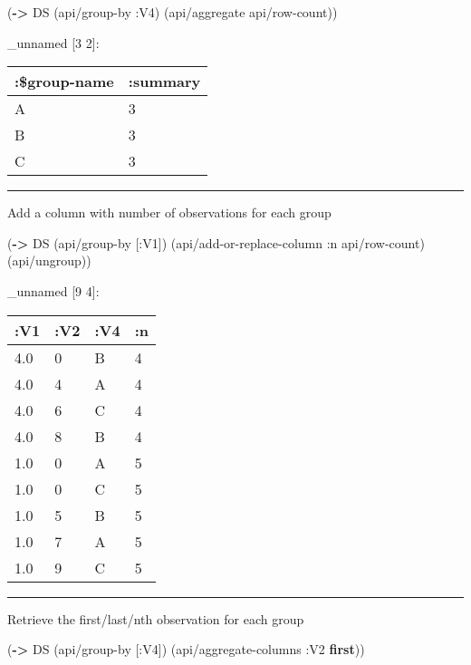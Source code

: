\documentclass[]{article}
\newenvironment{Shaded}{\begin{snugshade}}{\end{snugshade}}
\newcommand{\AttributeTok}[1]{\textcolor[rgb]{0.77,0.63,0.00}{#1}}
\newcommand{\KeywordTok}[1]{\textcolor[rgb]{0.13,0.29,0.53}{\textbf{#1}}}
\newcommand{\NormalTok}[1]{#1}
\begin{document}
\begin{Shaded}
\begin{Highlighting}[]
\NormalTok{(}\KeywordTok{->}\NormalTok{ DS}
\NormalTok{    (api/group-by }\AttributeTok{:V4}\NormalTok{)}
\NormalTok{    (api/aggregate api/row-count))}
\end{Highlighting}
\end{Shaded}

\_unnamed {[}3 2{]}:

\begin{longtable}[]{@{}ll@{}}
\toprule
:\$group-name & :summary\tabularnewline
\midrule
\endhead
A & 3\tabularnewline
B & 3\tabularnewline
C & 3\tabularnewline
\bottomrule
\end{longtable}

\begin{center}\rule{0.5\linewidth}{0.5pt}\end{center}

Add a column with number of observations for each group

\begin{Shaded}
\begin{Highlighting}[]
\NormalTok{(}\KeywordTok{->}\NormalTok{ DS}
\NormalTok{    (api/group-by [}\AttributeTok{:V1}\NormalTok{])}
\NormalTok{    (api/add-or-replace-column }\AttributeTok{:n}\NormalTok{ api/row-count)}
\NormalTok{    (api/ungroup))}
\end{Highlighting}
\end{Shaded}

\_unnamed {[}9 4{]}:

\begin{longtable}[]{@{}llll@{}}
\toprule
:V1 & :V2 & :V4 & :n\tabularnewline
\midrule
\endhead
4.0 & 0 & B & 4\tabularnewline
4.0 & 4 & A & 4\tabularnewline
4.0 & 6 & C & 4\tabularnewline
4.0 & 8 & B & 4\tabularnewline
1.0 & 0 & A & 5\tabularnewline
1.0 & 0 & C & 5\tabularnewline
1.0 & 5 & B & 5\tabularnewline
1.0 & 7 & A & 5\tabularnewline
1.0 & 9 & C & 5\tabularnewline
\bottomrule
\end{longtable}

\begin{center}\rule{0.5\linewidth}{0.5pt}\end{center}

Retrieve the first/last/nth observation for each group

\begin{Shaded}
\begin{Highlighting}[]
\NormalTok{(}\KeywordTok{->}\NormalTok{ DS}
\NormalTok{    (api/group-by [}\AttributeTok{:V4}\NormalTok{])}
\NormalTok{    (api/aggregate-columns }\AttributeTok{:V2} \KeywordTok{first}\NormalTok{))}
\end{Highlighting}
\end{Shaded}
\end{document}

